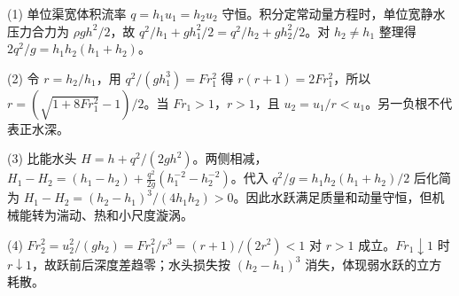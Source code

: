 (1) 单位渠宽体积流率 \(q=h_1u_1=h_2u_2\) 守恒。积分定常动量方程时，单位宽静水压力合力为 \(\rho gh^2/2\)，故 \(q^2/h_1+gh_1^2/2=q^2/h_2+gh_2^2/2\)。对 \(h_2\ne h_1\) 整理得 \(2q^2/g=h_1h_2(h_1+h_2)\)。

(2) 令 \(r=h_2/h_1\)，用 \(q^2/(gh_1^3)=Fr_1^2\) 得 \(r(r+1)=2Fr_1^2\)，所以 \(\boxed{r=(\sqrt{1+8Fr_1^2}-1)/2}\)。当 \(Fr_1>1\)，\(r>1\)，且 \(u_2=u_1/r<u_1\)。另一负根不代表正水深。

(3) 比能水头 \(H=h+q^2/(2gh^2)\)。两侧相减，\(H_1-H_2=(h_1-h_2)+\frac{q^2}{2g}(h_1^{-2}-h_2^{-2})\)。代入 \(q^2/g=h_1h_2(h_1+h_2)/2\) 后化简为 \(\boxed{H_1-H_2=(h_2-h_1)^3/(4h_1h_2)}>0\)。因此水跃满足质量和动量守恒，但机械能转为湍动、热和小尺度漩涡。

(4) \(Fr_2^2=u_2^2/(gh_2)=Fr_1^2/r^3=(r+1)/(2r^2)<1\) 对 \(r>1\) 成立。\(Fr_1\downarrow1\) 时 \(r\downarrow1\)，故跃前后深度差趋零；水头损失按 \((h_2-h_1)^3\) 消失，体现弱水跃的立方耗散。
